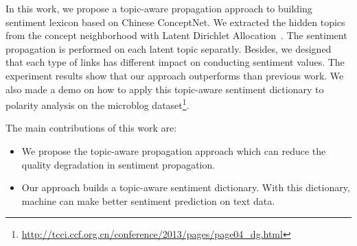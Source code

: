 In this work, we propose a topic-aware propagation approach to building sentiment lexicon based on Chinese ConceptNet. We extracted the hidden topics from the concept neighborhood with Latent Dirichlet Allocation~\cite{Blei:LDA03}. The sentiment propagation is performed on each latent topic separatly. Besides, we designed that each type of links has different impact on conducting sentiment values. The experiment results show that our approach outperforms than previous work. We also made a demo on how to apply this topic-aware sentiment dictionary to polarity analysis on the microblog dataset\footnote{\url{http://tcci.ccf.org.cn/conference/2013/pages/page04_dg.html}}.

The main contributions of this work are:
\begin{itemize}
  \item We propose the topic-aware propagation approach which can reduce the quality degradation in sentiment propagation.
  \item Our approach builds a topic-aware sentiment dictionary. With this dictionary, machine can make better sentiment prediction on text data.
\end{itemize}


